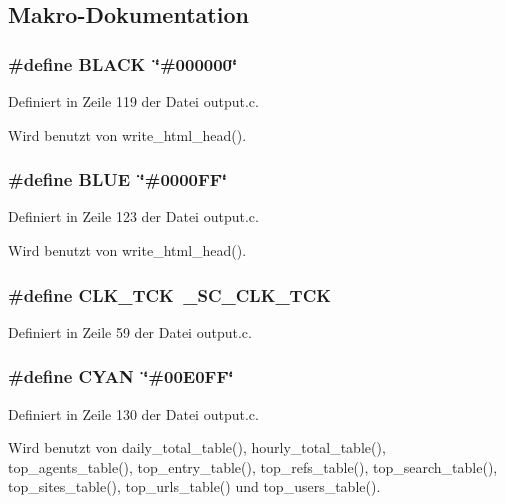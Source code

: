 \subsection{Makro-Dokumentation}
\subsubsection{\setlength{\rightskip}{0pt plus 5cm}\#define BLACK~\char`\"{}\#000000\char`\"{}}\label{output_8c_7b3b25cba33b07c303f3060fe41887f6}




Definiert in Zeile 119 der Datei output.c.

Wird benutzt von write\_\-html\_\-head().
\subsubsection{\setlength{\rightskip}{0pt plus 5cm}\#define BLUE~\char`\"{}\#0000FF\char`\"{}}\label{output_8c_79d10e672abb49ad63eeaa8aaef57c38}




Definiert in Zeile 123 der Datei output.c.

Wird benutzt von write\_\-html\_\-head().
\subsubsection{\setlength{\rightskip}{0pt plus 5cm}\#define CLK\_\-TCK~\_\-SC\_\-CLK\_\-TCK}\label{output_8c_03df76d1f70664d745ca8de2864e39b3}




Definiert in Zeile 59 der Datei output.c.
\subsubsection{\setlength{\rightskip}{0pt plus 5cm}\#define CYAN~\char`\"{}\#00E0FF\char`\"{}}\label{output_8c_d243f93c16bc4c1d3e0a13b84421d760}




Definiert in Zeile 130 der Datei output.c.

Wird benutzt von daily\_\-total\_\-table(), hourly\_\-total\_\-table(), top\_\-agents\_\-table(), top\_\-entry\_\-table(), top\_\-refs\_\-table(), top\_\-search\_\-table(), top\_\-sites\_\-table(), top\_\-urls\_\-table() und top\_\-users\_\-table().
